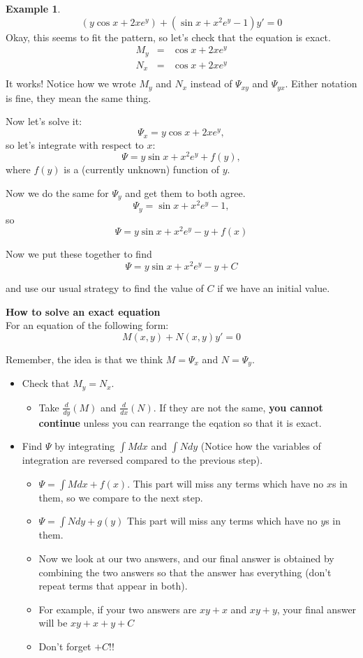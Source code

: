\documentclass[a5paper]{article}
\theoremstyle{definition}%
\newtheorem*{example*}{Example}
\numberwithin{exercise}{section}
\theoremstyle{remark}%
\begin{document}
\begin{highlight}
\begin{example*}
$$(y\cos x+2xe^y)+(\sin x+x^2e^y-1)y'=0$$
Okay, this seems to fit the pattern, so let's check that the equation is exact. 
\[\begin{array}{rcl}
M_y &=& \cos x+2xe^y\\
N_x &=& \cos x+2xe^y\\
\end{array}\]
It works! Notice how we wrote $M_y$ and $N_x$ instead of $\Psi_{xy}$ and $\Psi_{yx}$. Either notation is fine, they mean the same thing. 

Now let's solve it:
$$\Psi_x=y\cos x+2xe^y,$$
so let's integrate with respect to $x$:
$$\Psi=y\sin x+x^2e^y+f(y),$$
where $f(y)$ is a (currently unknown) function of $y$. 

Now we do the same for $\Psi_y$ and get them to both agree. 
$$\Psi_y=\sin x+x^2e^y-1,$$
so 
$$\Psi=y\sin x+x^2e^y-y+f(x)$$

Now we put these together to find 
$$\Psi=y\sin x+x^2e^y-y+C$$

and use our usual strategy to find the value of $C$ if we have an initial value. 
\end{example*}
\end{highlight}

\pagebreak
\begin{highlight}
\textbf{How to solve an exact equation}\\
For an equation of the following form:
$$M(x,y)+ N(x,y)y'=0$$

Remember, the idea is that we think $M = \Psi_x$ and $N=\Psi_y$.
\begin{itemize}
\item Check that $M_y=N_x$. 
	\begin{itemize}
	\item Take $\frac{d}{dy}(M)$ and $\frac{d}{dx}(N)$. If they are not the same, \textbf{you cannot continue} unless you can rearrange the eqation so that it is exact. 
	\end{itemize}
\item Find $\Psi$ by integrating $\int M dx$ and $\int N dy$ (Notice how the variables of integration are reversed compared to the previous step). 
	\begin{itemize}
	\item $\Psi = \int M dx + f(x)$. This part will miss any terms which have no $x$s in them, so we compare to the next step. 
	\item $\Psi = \int N dy + g(y)$ This part will miss any terms which have no $y$s in them.
	\item Now we look at our two answers, and our final answer is obtained by combining the two answers so that the answer has everything (don't repeat terms that appear in both).
	\item For example, if your two answers are $xy + x$ and $xy + y$, your final answer will be $xy + x + y + C$
	\item Don't forget $+C$!!
	\end{itemize}
\end{itemize}
\end{highlight}
\end{document}
